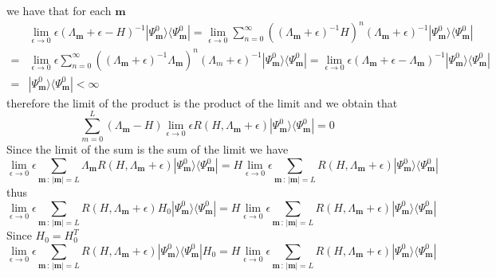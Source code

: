 \documentclass[10pt]{article}
\numberwithin{equation}{section}
\numberwithin{equation}{subsection}
\begin{document}
we have that for each $\bm{m}$ 
\begin{equation}
	\begin{split}
		&\lim_{\epsilon\to 0}\epsilon\left(\Lambda_{\bm{m}}+\epsilon-H\right)^{-1}|\Psi_{\bm{m}}^{0}\rangle\langle\Psi_{\bm{m}}^{0}|=\lim_{\epsilon\to 0}\sum_{n=0}^{\infty}\left((\Lambda_{\bm{m}}+\epsilon)^{-1}H\right)^{n}(\Lambda_{\bm{m}}+\epsilon)^{-1}|\Psi_{\bm{m}}^{0}\rangle\langle\Psi_{\bm{m}}^{0}|
		\\=&
		\lim_{\epsilon\to 0}\epsilon\sum_{n=0}^{\infty}\left((\Lambda_{\bm{m}}+\epsilon)^{-1}\Lambda_{\bm{m}}\right)^{n}(\Lambda_{m}+\epsilon)^{-1}|\Psi_{\bm{m}}^{0}\rangle\langle\Psi_{\bm{m}}^{0}|=\lim_{\epsilon\to 0}\epsilon\left(\Lambda_{\bm{m}}+\epsilon-\Lambda_{\bm{m}}\right)^{-1}|\Psi_{\bm{m}}^{0}\rangle\langle\Psi_{\bm{m}}^{0}|\\=&|\Psi_{\bm{m}}^{0}\rangle\langle\Psi_{\bm{m}}^{0}|<\infty
	\end{split}
\end{equation}
therefore the limit of the product is the product of the limit and we obtain that 
\begin{equation}
	\sum_{m=0}^{L}  (\Lambda_{\bm{m}}-H)\lim_{\epsilon\to 0}\epsilon R(H,\Lambda_{\bm{m}}+\epsilon)|\Psi_{\bm{m}}^{0}\rangle \langle \Psi_{\bm{m}}^{0}|=0
\end{equation}
Since the limit of the sum is the sum of the limit we have   
\begin{equation}
	\lim_{\epsilon\to 0}\epsilon\sum_{\bm{m}\,:\, |\bm{m}|=L}  \Lambda_{\bm{m}}R(H,\Lambda_{\bm{m}}+\epsilon)|\Psi_{\bm{m}}^{0}\rangle \langle \Psi_{\bm{m}}^{0}|= H\lim_{\epsilon\to 0}\epsilon\sum_{\bm{m}\,:\, |\bm{m}|=L}  R(H,\Lambda_{\bm{m}}+\epsilon)|\Psi_{\bm{m}}^{0}\rangle \langle \Psi_{\bm{m}}^{0}|
\end{equation}
thus 
\begin{equation}
	\lim_{\epsilon\to 0}\epsilon\sum_{\bm{m}\,:\,|\bm{m}|=L}  R(H,\Lambda_{\bm{m}}+\epsilon)H_{0}|\Psi_{\bm{m}}^{0}\rangle \langle \Psi_{\bm{m}}^{0}|= H\lim_{\epsilon\to 0}\epsilon\sum_{\bm{m}\,:\,|\bm{m}|=L}  R(H,\Lambda_{\bm{m}}+\epsilon)|\Psi_{\bm{m}}^{0}\rangle \langle \Psi_{\bm{m}}^{0}|
\end{equation}
Since $H_{0}=H_{0}^{T}$ 
\begin{equation}
	\lim_{\epsilon\to 0}\epsilon\sum_{\bm{m}\,:\,|\bm{m}|=L}  R(H,\Lambda_{\bm{m}}+\epsilon)|\Psi_{\bm{m}}^{0}\rangle \langle \Psi_{\bm{m}}^{0}|H_{0}= H\lim_{\epsilon\to 0}\epsilon\sum_{\bm{m}\,:\,|\bm{m}|=L}  R(H,\Lambda_{\bm{m}}+\epsilon)|\Psi_{\bm{m}}^{0}\rangle \langle \Psi_{\bm{m}}^{0}|
\end{equation}
\end{document}
